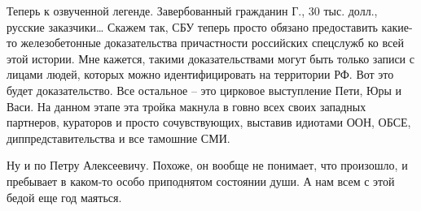 Теперь к озвученной легенде. Завербованный гражданин Г., 30 тыс. долл., русские
заказчики… Скажем так, СБУ теперь просто обязано предоставить какие-то
железобетонные доказательства причастности российских спецслужб ко всей этой
истории. Мне кажется, такими доказательствами могут быть только записи с лицами
людей, которых можно идентифицировать на территории РФ. Вот это будет
доказательство. Все остальное – это цирковое выступление Пети, Юры и Васи. На
данном этапе эта тройка макнула в говно всех своих западных партнеров,
кураторов и просто сочувствующих, выставив идиотами ООН, ОБСЕ,
диппредставительства и все тамошние СМИ.

Ну и по Петру Алексеевичу. Похоже, он вообще не понимает, что произошло, и
пребывает в каком-то особо приподнятом состоянии души. А нам всем с этой бедой
еще год маяться.

